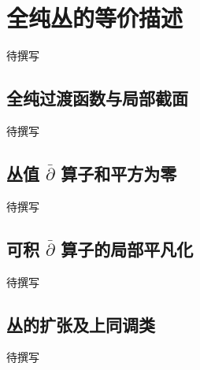 
% 
% 
% 
% 

\section{全纯丛的等价描述}
\label{g4:sec:1601}

待撰写

\subsection{全纯过渡函数与局部截面}
\label{g4:subsec:1601:01}
待撰写

\subsection{\texorpdfstring{丛值 \(\bar{\partial}\) 算子和平方为零}{丛值 \={∂} 算子和平方为零}}
\label{g4:subsec:1601:02}
待撰写

\subsection{\texorpdfstring{可积 \(\bar{\partial}\) 算子的局部平凡化}{可积 \={∂} 算子的局部平凡化}}
\label{g4:subsec:1601:03}
待撰写

\subsection{丛的扩张及上同调类}
\label{g4:subsec:1601:04}
待撰写
